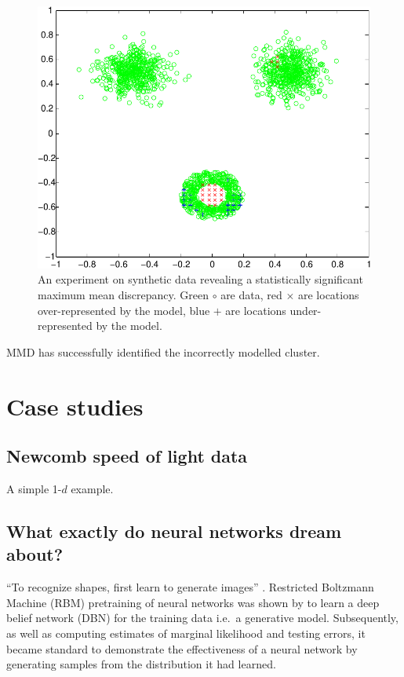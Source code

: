 \documentclass{article}
\def\ie{i.e.\ }
\begin{document}
\begin{figure}[ht]
\centering
\includegraphics[width=0.98\columnwidth]{figures/blob_blob_ring}
\caption{
An experiment on synthetic data revealing a statistically significant maximum mean discrepancy.
Green $\circ$ are data, red $\times$ are locations over-represented by the model, blue $+$ are locations under-represented by the model.
}
\label{fig:blob_blob_ring}
\end{figure}

MMD has successfully identified the incorrectly modelled cluster.

\section{Case studies}

\subsection{Newcomb speed of light data}

A simple 1-$d$ example.

\subsection{What exactly do neural networks dream about?}

``To recognize shapes, first learn to generate images'' \cite{Hinton2007}.
Restricted Boltzmann Machine (RBM) pretraining of neural networks was shown by \cite{Hinton2006} to learn a deep belief network (DBN) for the training data \ie a generative model.
Subsequently, as well as computing estimates of marginal likelihood and testing errors, it became standard to demonstrate the effectiveness of a neural network by generating samples from the distribution it had learned.
\end{document}
